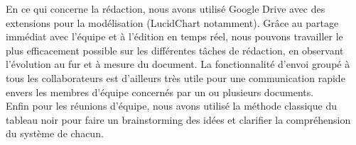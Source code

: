 En ce qui concerne la rédaction, nous avons utilisé Google Drive avec des
extensions pour la modélisation (LucidChart notamment). Grâce au partage
immédiat avec l'équipe et à l'édition en temps réel, nous pouvons travailler le
plus efficacement possible sur les différentes tâches de rédaction, en
observant l'évolution au fur et à mesure du document. La fonctionnalité d'envoi
groupé à tous les collaborateurs est d'ailleurs très utile pour une
communication rapide envers les membres d'équipe concernés par un ou plusieurs
documents. \\

Enfin pour les réunions d'équipe, nous avons utilisé la méthode classique du
tableau noir pour faire un brainstorming des idées et clarifier la
compréhension du système de chacun.


